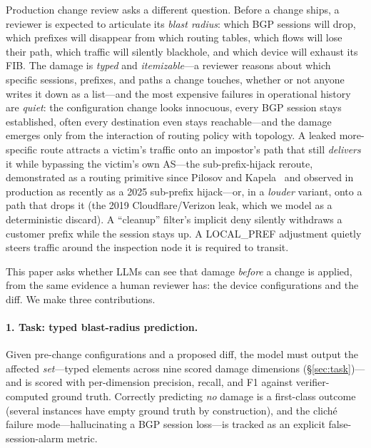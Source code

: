 \documentclass[11pt]{article}
\begin{document}
Production change review asks a different question. Before a change ships,
a reviewer is expected to articulate its \emph{blast radius}: which BGP
sessions will drop, which prefixes will disappear from which routing tables,
which flows will lose their path, which traffic will silently blackhole, and
which device will exhaust its FIB. The damage is \emph{typed} and
\emph{itemizable}---a reviewer reasons about which specific sessions,
prefixes, and paths a change touches, whether or not anyone writes it down as
a list---and the most expensive failures in operational history are
\emph{quiet}: the configuration change looks innocuous, every BGP session
stays established, often every destination even stays reachable---and the
damage emerges only from the interaction of routing policy with topology. A
leaked more-specific route attracts a victim's traffic onto an impostor's path
that still \emph{delivers} it while bypassing the victim's own AS---the
sub-prefix-hijack reroute, demonstrated as a routing primitive since Pilosov
and Kapela~\cite{pilosov} and observed in production as recently as a 2025
sub-prefix hijack---or, in a \emph{louder} variant, onto a path that drops it
(the 2019 Cloudflare/Verizon leak, which we model as a deterministic discard).
A ``cleanup'' filter's implicit deny silently withdraws a customer prefix
while the session stays up. A LOCAL\_PREF adjustment quietly steers traffic
around the inspection node it is required to transit.

This paper asks whether LLMs can see that damage \emph{before} a change is
applied, from the same evidence a human reviewer has: the device
configurations and the diff. We make three contributions.

\paragraph{1. Task: typed blast-radius prediction.} Given pre-change
configurations and a proposed diff, the model must output the affected
\emph{set}---typed elements across nine scored damage dimensions
(\S\ref{sec:task})---and is scored with per-dimension precision, recall, and
F1 against verifier-computed ground truth. Correctly predicting \emph{no}
damage is a first-class outcome (several instances have empty ground truth by
construction), and the clich\'e failure mode---hallucinating a BGP session
loss---is tracked as an explicit false-session-alarm metric.
\end{document}
